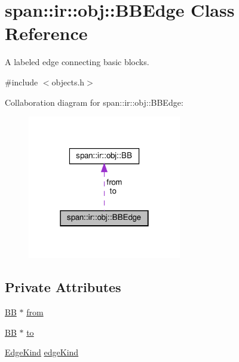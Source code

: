 \hypertarget{classspan_1_1ir_1_1obj_1_1BBEdge}{}\section{span\+:\+:ir\+:\+:obj\+:\+:B\+B\+Edge Class Reference}
\label{classspan_1_1ir_1_1obj_1_1BBEdge}


A labeled edge connecting basic blocks.  




{\ttfamily \#include $<$objects.\+h$>$}



Collaboration diagram for span\+:\+:ir\+:\+:obj\+:\+:B\+B\+Edge\+:\nopagebreak
\begin{figure}[H]
\begin{center}
\leavevmode
\includegraphics[width=190pt]{classspan_1_1ir_1_1obj_1_1BBEdge__coll__graph}
\end{center}
\end{figure}
\subsection*{Private Attributes}
\begin{DoxyCompactItemize}
\item 
\hyperlink{classspan_1_1ir_1_1obj_1_1BB}{BB} $\ast$ \hyperlink{classspan_1_1ir_1_1obj_1_1BBEdge_a1b9b3319ff37cd051b3a4ec6733656da}{from}
\item 
\hyperlink{classspan_1_1ir_1_1obj_1_1BB}{BB} $\ast$ \hyperlink{classspan_1_1ir_1_1obj_1_1BBEdge_a32bbef719761ee452e6b225551cf3e11}{to}
\item 
\hyperlink{namespacespan_1_1ir_1_1obj_a3687553dc31f18fb1bd62e0798a3f7f0}{Edge\+Kind} \hyperlink{classspan_1_1ir_1_1obj_1_1BBEdge_acf9ddd26f84acad75430f9a19a900440}{edge\+Kind}
\end{DoxyCompactItemize}


